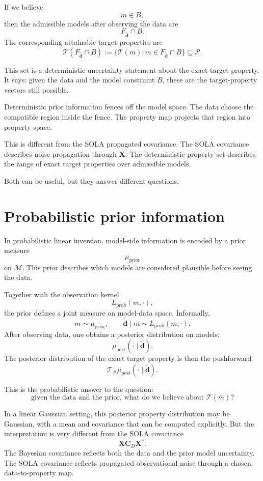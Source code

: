 \documentclass[11pt,openany]{book}
\theoremstyle{definition}
\theoremstyle{remark}
\newcommand{\M}{\mathcal M}
\newcommand{\Pspace}{\mathcal P}
\newcommand{\Tau}{\mathcal{T}}
\begin{document}
If we believe
\[
  \bar m\in B,
\]
then the admissible models after observing the data are
\[
  F_{\widetilde{\mathbf d}}\cap B.
\]
The corresponding attainable target properties are
\[
  \Tau(F_{\widetilde{\mathbf d}}\cap B)
  :=
  \{\Tau(m):m\in F_{\widetilde{\mathbf d}}\cap B\}
  \subseteq\Pspace.
\]

This set is a deterministic uncertainty statement about the exact target property. It says:
given the data and the model constraint \(B\), these are the target-property vectors still
possible.

\begin{intuitionbox}
Deterministic prior information fences off the model space. The data choose the compatible
region inside the fence. The property map projects that region into property space.
\end{intuitionbox}

This is different from the SOLA propagated covariance. The SOLA covariance describes noise
propagation through \(\mathbf X\). The deterministic property set describes the range of exact
target properties over admissible models.

Both can be useful, but they answer different questions.

\section{Probabilistic prior information}

In probabilistic linear inversion, model-side information is encoded by a prior measure
\[
  \mu_{\mathrm{prior}}
\]
on \(\M\). This prior describes which models are considered plausible before seeing the data.

Together with the observation kernel
\[
  L_{\mathrm{prob}}(m,\cdot),
\]
the prior defines a joint measure on model-data space. Informally,
\[
  m\sim\mu_{\mathrm{prior}},
  \qquad
  \widetilde{\mathbf d}\mid m\sim L_{\mathrm{prob}}(m,\cdot).
\]
After observing data, one obtains a posterior distribution on models:
\[
  \mu_{\mathrm{post}}(\cdot\mid \widetilde{\mathbf d}).
\]
The posterior distribution of the exact target property is then the pushforward
\[
  \Tau_{\#}\mu_{\mathrm{post}}(\cdot\mid \widetilde{\mathbf d}).
\]

This is the probabilistic answer to the question:
\[
  \text{given the data and the prior, what do we believe about }\Tau(\bar m)?
\]

In a linear Gaussian setting, this posterior property distribution may be Gaussian, with a mean
and covariance that can be computed explicitly. But the interpretation is very different from
the SOLA covariance
\[
  \mathbf X\mathbf C_D\mathbf X^*.
\]
The Bayesian covariance reflects both the data and the prior model uncertainty. The SOLA
covariance reflects propagated observational noise through a chosen data-to-property map.
\end{document}
